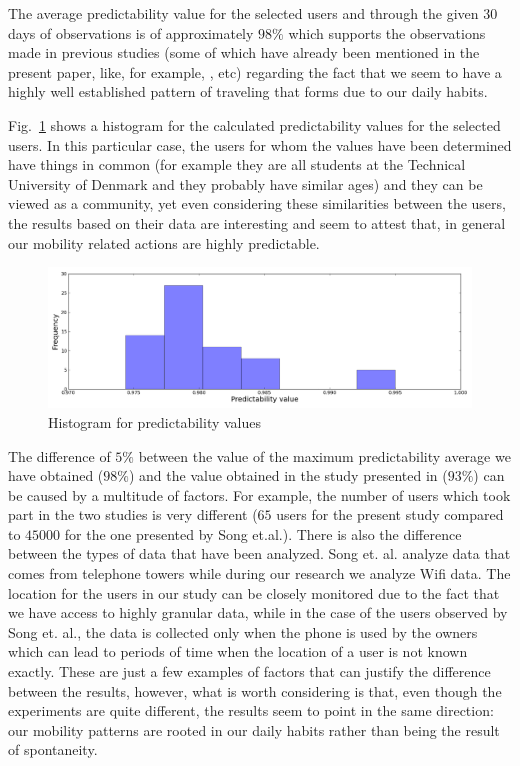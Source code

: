 The average predictability value for the selected users and through the given
$30$ days of observations is of approximately $98\%$ which supports the
observations made in previous studies (some of which have already been mentioned
in the present paper, like, for example, \cite{song2010limits},
\cite{Barabasi08} etc) regarding the fact that we seem to have a highly well
established pattern of traveling that forms due to our daily habits.

Fig.~\ref{pred_histo} shows a histogram for the calculated predictability values
for the selected users. In this particular case, the users for whom the values
have been determined have things in common (for example they are all students
at the Technical University of Denmark and they probably have similar ages) and
they can be viewed as a community, yet even considering these similarities
between the users, the results based on their data are interesting and seem to
attest that, in general our mobility related actions are highly predictable.

\begin{figure}[!h]
\centering
\includegraphics[width=\textwidth]{figures/entro_pred/pred_hist.png}
\caption{Histogram for predictability values}
\label{pred_histo}
\end{figure}

The difference of $5\%$ between the value of the maximum predictability average
we have obtained ($98\%$) and the value obtained in the study presented in
\cite{song2010limits} ($93\%$) can be caused by a multitude of factors. For
example, the number of users which took part in the two studies is very
different ($65$ users for the present study compared to $45000$ for the one
presented by Song et.al.). There is also the difference between the types of
data that have been analyzed. Song et. al. analyze data that comes from
telephone towers while during our research we analyze Wifi data. The location
for the users in our study can be closely monitored due to the fact that we have
access to highly granular data, while in the case of the users observed by Song
et. al., the data is collected only when the phone is used by the owners which
can lead to periods of time when the location of a user is not known exactly.
These are just a few examples of factors that can justify the difference between
the results, however, what is worth considering is that, even though the
experiments are quite different, the results seem to point in the same
direction: our mobility patterns are rooted in our daily habits rather than
being the result of spontaneity.
